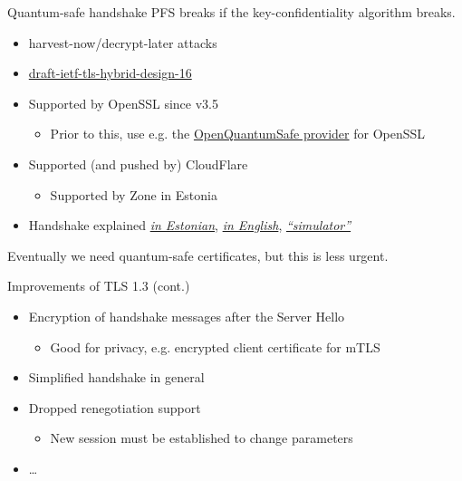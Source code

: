 \begin{frame}{Quantum-safe handshake}
  PFS breaks if the key-confidentiality algorithm breaks.
  \begin{itemize}[<+(1)->]
    \item harvest-now/decrypt-later attacks
    \item \href{https://datatracker.ietf.org/doc/html/draft-ietf-tls-hybrid-design-16}{draft-ietf-tls-hybrid-design-16}
    \item Supported by OpenSSL since v3.5
    \par
    \begin{itemize}
      \item Prior to this, use e.g. the \href{https://github.com/open-quantum-safe/oqs-provider}{OpenQuantumSafe provider} for OpenSSL
    \end{itemize}
    \item Supported (and pushed by) CloudFlare
    \par
    \begin{itemize}
      \item Supported by Zone in Estonia
    \end{itemize}
    \item Handshake explained \href{https://www.ria.ee/blogi/tls-13-votme-kvantkindel-hubriidkehtestus-x25519mlkem768}{\textit{in Estonian}}, \href{https://blog.cloudflare.com/post-quantum-for-all/}{\textit{in English}}, \href{https://www.pqctoday.com/learn/tls-basics/}{\textit{\enquote{simulator}}}
  \end{itemize}

  \vspace*{1em}

  \pause
  Eventually we need quantum-safe certificates, but this is less urgent.
\end{frame}

\begin{frame}{Improvements of TLS 1.3 (cont.)}
  \begin{itemize}[<+(1)->]
    \item Encryption of handshake messages after the Server Hello
    \begin{itemize}
      \item Good for privacy, e.g. encrypted client certificate for mTLS
    \end{itemize}
    \item Simplified handshake in general
    \item Dropped renegotiation support
    \begin{itemize}
      \item New session must be established to change parameters
    \end{itemize}
    \item \dots
  \end{itemize}
\end{frame}

